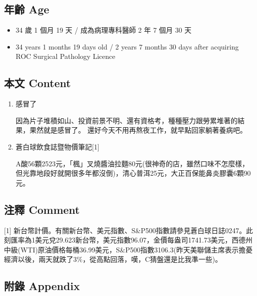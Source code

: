 \documentclass[
]{article}
\providecommand{\tightlist}{%
  \setlength{\itemsep}{0pt}\setlength{\parskip}{0pt}}
\begin{document}
\hypertarget{ux5e74ux9f61-age-10}{%
\subsection{年齡 Age}\label{ux5e74ux9f61-age-10}}

\begin{itemize}
\tightlist
\item
  34 歲 1 個月 19 天 / 成為病理專科醫師 2 年 7 個月 30 天
\item
  34 years 1 months 19 days old / 2 years 7 months 30 days after
  acquiring ROC Surgical Pathology Licence
\end{itemize}

\hypertarget{ux672cux6587-content-10}{%
\subsection{本文 Content}\label{ux672cux6587-content-10}}

\begin{enumerate}
\def\labelenumi{\arabic{enumi}.}
\item
  感冒了

  因為片子堆積如山、投資前景不明、還有資格考，種種壓力跟勞累堆著的結果，果然就是感冒了。
  還好今天不用再熬夜工作，就早點回家躺著養病吧。
\item
  蒼白球飲食誌暨物價筆記{[}1{]}

  A酸56顆2523元，「楓」叉燒醬油拉麵80元(很神奇的店，雖然口味不怎麼樣，但光靠地段好就開很多年都沒倒)，清心普洱25元，大正百保能鼻炎膠囊6顆90元。
\end{enumerate}

\hypertarget{ux6ce8ux91cb-comment-10}{%
\subsection{注釋 Comment}\label{ux6ce8ux91cb-comment-10}}

{[}1{]}
新台幣計價。有關新台幣、美元指數、S\&P500指數請參見蒼白球日誌0247。此刻匯率為1美元兌29.623新台幣，美元指數96.07，金價每盎司1741.73美元，西德州中級(WTI)原油價格每桶36.99美元，S\&P500指數3106.3(昨天美聯儲主席表示擔憂經濟以後，兩天就跌了3\%，從高點回落，嘆，C猜盤還是比我準一些)。

\hypertarget{ux9644ux9304-appendix-10}{%
\subsection{附錄 Appendix}\label{ux9644ux9304-appendix-10}}
\end{document}
